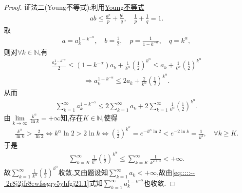 \documentclass[../../main.tex]{subfiles}%
\begin{document}
\begin{proof}
{\color{blue}证法二(Young不等式):}利用\hyperref[theorem:Young不等式初等形式]{Young不等式}
\begin{align*}
ab\leqslant \frac{a^p}{p}+\frac{b^q}{q},\quad \frac{1}{p}+\frac{1}{q}=1.
\end{align*}
取
\begin{align*}
a=a_{k}^{1-k^{-\alpha}},\quad b=\frac{1}{2},\quad p=\frac{1}{1-k^{-\alpha}},\quad q=k^{\alpha},
\end{align*}
则对$\forall k\in \mathbb{N}$,有
\begin{align*}
\frac{a_{k}^{1-k^{-\alpha}}}{2}\leqslant \left( 1-k^{-\alpha} \right) a_k+\frac{1}{k^{\alpha}}\left( \frac{1}{2} \right) ^{k^{\alpha}}\leqslant a_k+\frac{1}{k^{\alpha}}\left( \frac{1}{2} \right) ^{k^{\alpha}}
\end{align*}
\begin{align*}
\Longrightarrow a_{k}^{1-k^{-\alpha}}\leqslant 2a_k+\frac{2}{k^{\alpha}}\left( \frac{1}{2} \right) ^{k^{\alpha}}.
\end{align*}
从而
\begin{align}
\sum\limits_{k=1}^{\infty}{a_{k}^{1-k^{-\alpha}}}\leqslant 2\sum\limits_{k=1}^{\infty}{a_k}+2\sum\limits_{k=1}^{\infty}{\frac{1}{k^{\alpha}}\left( \frac{1}{2} \right) ^{k^{\alpha}}}. \label{eq:::::---2r8j2jfr8ewfssgry5yhfgj21.1}
\end{align}
由$\lim\limits_{k\rightarrow \infty}{\frac{k^{\alpha}}{\ln k}}=+\infty$知,存在$K\in \mathbb{N}$,使得
\begin{align*}
\frac{k^{\alpha}}{\ln k}>\frac{2}{\ln 2}\Longleftrightarrow k^{\alpha}\ln 2>2\ln k\Longleftrightarrow \left( \frac{1}{2} \right) ^{k^{\alpha}}=e^{-k^{\alpha}\ln 2}<e^{-2\ln k}=\frac{1}{k^2},\quad \forall k\geqslant K.
\end{align*}
于是
\begin{align*}
\sum\limits_{k=K}^{\infty}{\frac{1}{k^{\alpha}}\left( \frac{1}{2} \right) ^{k^{\alpha}}}\leqslant \sum\limits_{k=K}^{\infty}{\frac{1}{k^{2+\alpha}}}<+\infty.
\end{align*}
故$\sum\limits_{k=1}^{\infty}{\frac{1}{k^{\alpha}}\left( \frac{1}{2} \right) ^{k^{\alpha}}}$收敛,又由题设知$\sum\limits_{k=1}^{\infty}{a_k}<+\infty$,故由\eqref{eq:::::---2r8j2jfr8ewfssgry5yhfgj21.1}式知$\sum\limits_{k=1}^{\infty}{a_{k}^{1-k^{-\alpha}}}$也收敛.

\end{proof}
\end{document}
